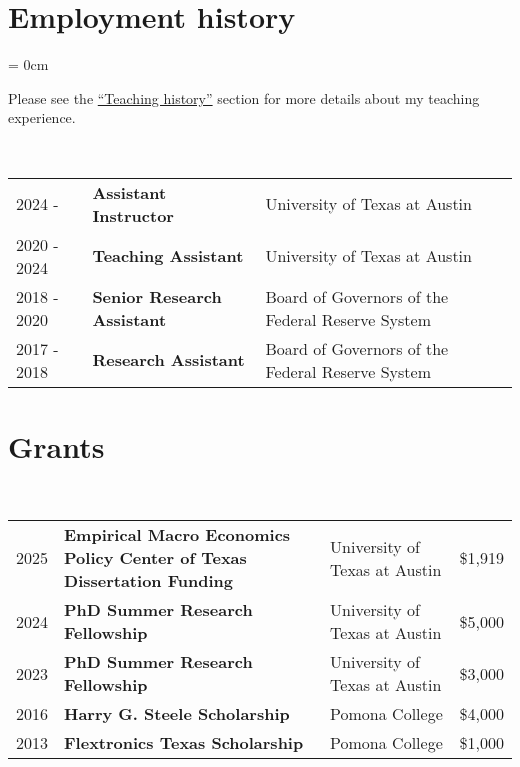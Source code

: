 \documentclass[a4paper, 10pt]{article}
\begin{document}
  \vspace*{0.25em}

  \section{Employment history}
  \begin{compactitem}\parskip = 0cm
    \item Please see the {\hypersetup{linkcolor = black}\hyperref[sec:teaching_history]{``Teaching history''}} section for more details about my teaching experience.
  \end{compactitem}
  \vspace*{0.70em}
  ~\begin{tabular}{lll}
    2024 - & \textbf{Assistant Instructor} & University of Texas at Austin\\
    2020 - 2024 & \textbf{Teaching Assistant} & University of Texas at Austin\\
    2018 - 2020 & \textbf{Senior Research Assistant} & Board of Governors of the Federal Reserve System\\
    2017 - 2018 & \textbf{Research Assistant} & Board of Governors of the Federal Reserve System
  \end{tabular}
  \vspace*{0.25em}
      
  \section{Grants}
  ~\begin{tabular}{p{0.7cm} p{7.75cm} p{4.2cm} p{0.95cm}}
    2025 & \textbf{Empirical Macro Economics Policy Center of Texas \newline Dissertation Funding} & University of Texas at Austin & \$1,919\\
    2024 & \textbf{PhD Summer Research Fellowship} & University of Texas at Austin & \$5,000\\
    2023 & \textbf{PhD Summer Research Fellowship} & University of Texas at Austin & \$3,000\\
    2016 & \textbf{Harry G. Steele Scholarship} & Pomona College & \$4,000\\
    2013 & \textbf{Flextronics Texas Scholarship} & Pomona College & \$1,000
  \end{tabular}
  \vspace*{0.25em}
    
\end{document}
